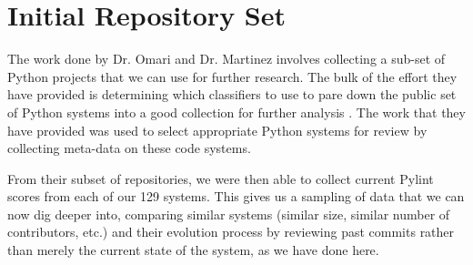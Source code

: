 \section{Initial Repository Set}

The work done by Dr. Omari and Dr. Martinez involves collecting a sub-set of Python projects that we can use for further research. The bulk of the effort they have provided is determining which classifiers to use to pare down the public set of Python systems into a good collection for further analysis \cite{omari:2018}. The work that they have provided was used to select appropriate Python systems for review by collecting meta-data on these code systems.

From their subset of repositories, we were then able to collect current Pylint scores from each of our 129 systems. This gives us a sampling of data that we can now dig deeper into, comparing similar systems (similar size, similar number of contributors, etc.) and their evolution process by reviewing past commits rather than merely the current state of the system, as we have done here.